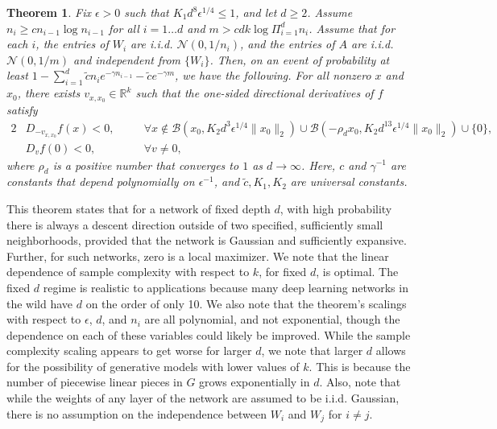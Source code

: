 \documentclass[11pt]{article}
\newtheorem{theorem}{Theorem} %
\newcommand{\ctilde}{\tilde{c}}
\newcommand{\R}{\mathbb{R}}
\newcommand{\calB}{\mathcal{B}}
\newcommand{\eps}{\epsilon}
\newcommand{\zetacheck}{\rho}
\newcommand{\red}[1]{{\color{black} #1}}
\newcommand{\xo}{x_0}
\newcommand{\vxxo}{v_{x, \xo}}
\begin{document}
\begin{theorem} \label{thm-multi-layer-XX}
Fix $\eps >0$ such that $K_1 d^8 \eps^{1/4} \leq 1$, and let $d \geq 2$.  Assume $n_i \geq c n_{i-1} \log n_{i-1}$ for all $i = 1 \ldots d$ and $m > c d  k \log \Pi_{i=1}^d n_i$.  Assume that for each $i$, the entries of $W_i$ are i.i.d. $\mathcal{N}(0, 1/n_i)$, and the entries of $A$ are i.i.d. $\mathcal{N}(0, 1/m)$ and independent from $\{W_i\}$.
Then, on an event of probability at least $1 -  \sum_{i=1}^d \ctilde n_i e^{-\gamma n_{i-1} }- \ctilde e^{-\gamma m}$, we have the following. For all nonzero $x$ and $\xo$, there exists $\vxxo \in \R^k$ such that the one-sided directional derivatives of $f$ satisfy
\begin{alignat*}{2}
&D_{-\vxxo} f(x) <0, \quad & & \forall x  \not\in  \calB(\xo, K_2 d^{3} \eps^{1/4} \|\xo\|_2) \cup \calB(-\zetacheck_d \xo, K_2 d^{13} \eps^{1/4} \|\xo\|_2) \cup \{0\},\\
&D_v f(0) < 0, & &\forall v \neq 0,
\end{alignat*}
where $\rho_d$ is a positive number that converges to $1$ as $d \to \infty$.
  Here, $c$ and $\gamma^{-1}$ are constants that depend polynomially on $\eps^{-1}$, and $\ctilde, K_1, K_2$ are universal constants.  

\end{theorem}
\red{This theorem states that for a network of fixed depth $d$, with high probability there is always a descent direction outside of  two specified, sufficiently small neighborhoods, provided that the network is Gaussian and sufficiently expansive.  Further, for such networks, zero is a local maximizer.  We note that the linear dependence of sample complexity with respect to $k$, for fixed $d$, is optimal.  The fixed $d$ regime is realistic to applications because many deep learning networks in the wild have $d$ on the order of only 10.  We also note that the theorem's scalings with respect to $\eps$, $d$, and $n_i$ are all polynomial, and not exponential, though the dependence on each of these variables could likely be improved.  While the sample complexity scaling appears to get worse for larger $d$, we note that larger $d$ allows for the possibility of generative models with lower values of $k$.  This is because the number of piecewise linear pieces in $G$ grows exponentially in $d$.}  Also, note that while the weights of any layer of the network are assumed to be i.i.d. Gaussian, there is no assumption on the independence between $W_i$ and $W_j$ for $i \neq j$.
\end{document}

